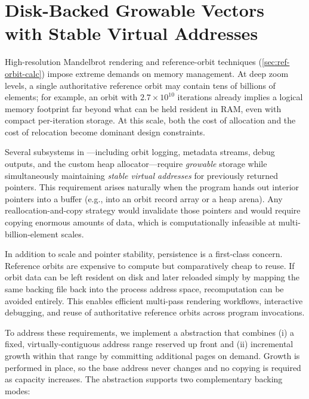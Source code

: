 \section{Disk-Backed Growable Vectors with Stable Virtual Addresses}
\label{sec:disk_backed_growable_vectors}

High-resolution Mandelbrot rendering and reference-orbit techniques (\cref{sec:ref-orbit-calc}) impose
extreme demands on memory management. At deep zoom levels, a single authoritative
reference orbit may contain tens of billions of elements; for example, an orbit
with $2.7\times10^{10}$ iterations already implies a logical memory footprint far
beyond what can be held resident in RAM, even with compact per-iteration storage.
At this scale, both the cost of allocation and the cost of relocation become
dominant design constraints.

Several subsystems in \FractalShark{}—including orbit logging, metadata streams,
debug outputs, and the custom heap allocator—require \emph{growable} storage
while simultaneously maintaining \emph{stable virtual addresses} for previously
returned pointers. This requirement arises naturally when the program hands out
interior pointers into a buffer (e.g., into an orbit record array or a heap
arena). Any reallocation-and-copy strategy would invalidate those pointers and
would require copying enormous amounts of data, which is computationally
infeasible at multi-billion-element scales.

In addition to scale and pointer stability, persistence is a first-class
concern. Reference orbits are expensive to compute but comparatively cheap to
reuse. If orbit data can be left resident on disk and later reloaded simply by
mapping the same backing file back into the process address space, recomputation
can be avoided entirely. This enables efficient multi-pass rendering workflows,
interactive debugging, and reuse of authoritative reference orbits across program
invocations.

To address these requirements, we implement a
 abstraction that combines (i) a fixed,
virtually-contiguous address range reserved up front and (ii) incremental growth
within that range by committing additional pages on demand. Growth is performed
in place, so the base address never changes and no copying is required as
capacity increases. The abstraction supports two complementary backing modes:

